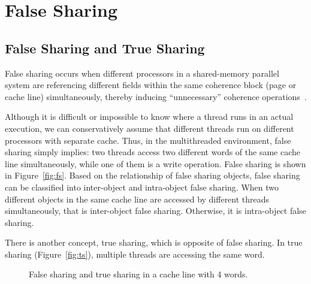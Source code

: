 \section{False Sharing}

\subsection{False Sharing and True Sharing}
False sharing occurs when different processors in a shared-memory parallel system are referencing different fields within the same coherence block (page or cache line) simultaneously, thereby inducing ``unnecessary'' coherence operations~\cite{Bolosky:1993:FSE:1295480.1295483}. 

Although it is difficult or impossible to know where a thread runs in an actual execution, we can conservatively assume that different threads run on different processors with separate cache. Thus, in the multithreaded environment, false sharing simply implies: two threads access two different words of the same cache line simultaneously, while one of them is a write operation. False sharing is shown in Figure~\ref{fig:fs}. 
Based on the relationship of false sharing objects, 
false sharing can be classified into inter-object and intra-object false sharing. When two different objects in the same cache line are accessed by different threads simultaneously, that is inter-object false sharing. Otherwise, it is intra-object false sharing. 

There is another concept, true sharing, which is opposite of false sharing. In true sharing (Figure~\ref{fig:ts}), multiple threads are accessing the same word. 

\begin{figure}
\begin{center} 
%
\hspace{50pt}
%
\end{center}
\caption{False sharing and true sharing in a cache line with 4 words. }
\label{fig:fsexample}
\end{figure}

